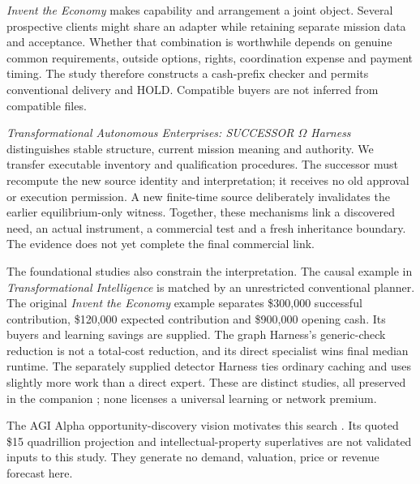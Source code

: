 \emph{Invent the Economy} makes capability and arrangement a joint object. Several prospective clients might share an adapter while retaining separate mission data and acceptance. Whether that combination is worthwhile depends on genuine common requirements, outside options, rights, coordination expense and payment timing. The study therefore constructs a cash-prefix checker and permits conventional delivery and HOLD. Compatible buyers are not inferred from compatible files.

\emph{Transformational Autonomous Enterprises: SUCCESSOR $\Omega$ Harness} distinguishes stable structure, current mission meaning and authority. We transfer executable inventory and qualification procedures. The successor must recompute the new source identity and interpretation; it receives no old approval or execution permission. A new finite-time source deliberately invalidates the earlier equilibrium-only witness. Together, these mechanisms link a discovered need, an actual instrument, a commercial test and a fresh inheritance boundary. The evidence does not yet complete the final commercial link.

The foundational studies also constrain the interpretation. The causal example in \emph{Transformational Intelligence} is matched by an unrestricted conventional planner. The original \emph{Invent the Economy} example separates \$300,000 successful contribution, \$120,000 expected contribution and \$900,000 opening cash. Its buyers and learning savings are supplied. The graph Harness's generic-check reduction is not a total-cost reduction, and its direct specialist wins final median runtime. The separately supplied detector Harness ties ordinary caching and uses slightly more work than a direct expert. These are distinct studies, all preserved in the companion \cite{foundations}; none licenses a universal learning or network premium.

The AGI Alpha opportunity-discovery vision motivates this search \cite{vision}. Its quoted \$15 quadrillion projection and intellectual-property superlatives are not validated inputs to this study. They generate no demand, valuation, price or revenue forecast here.
